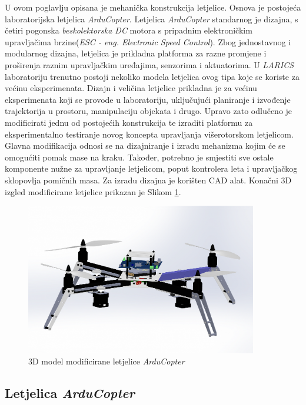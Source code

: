\documentclass[11pt,a4paper]{article}
\begin{document}
U ovom poglavlju opisana je mehanička konstrukcija letjelice. Osnova je postojeća laboratorijska letjelica  \textit{ArduCopter}. Letjelica  \textit{ArduCopter} standarnog je dizajna, s četiri pogonska \textit{beskolektorska DC} motora s pripadnim  elektroničkim upravljačima brzine(\textit{ESC - eng. Electronic Speed Control}). Zbog jednostavnog i modularnog dizajna, letjelica je prikladna platforma za razne promjene i proširenja raznim upravljačkim uređajima, senzorima i aktuatorima. U \textit{LARICS} laboratoriju trenutno postoji nekoliko modela letjelica ovog tipa koje se koriste za većinu eksperimenata. Dizajn i veličina letjelice prikladna je za većinu eksperimenata koji se provode u laboratoriju, uključujući planiranje i izvođenje trajektorija u prostoru, manipulaciju objekata i drugo. Upravo zato odlučeno je modificirati jednu od postojećih konstrukcija te izraditi platformu za eksperimentalno testiranje novog koncepta upravljanja višerotorskom letjelicom. Glavna modifikacija odnosi se na dizajniranje i izradu mehanizma kojim će se omogućiti pomak mase na kraku. Također, potrebno je smjestiti sve ostale komponente nužne za upravljanje letjelicom, poput kontrolera leta i upravljačkog sklopovlja pomičnih masa. Za izradu dizajna je korišten CAD alat. Konačni 3D izgled modificirane letjelice prikazan je Slikom \ref{Slika:3D_drone_final}.

\begin{figure}[H]
	\centering
	\includegraphics[width=0.9\textwidth]{figures/arducopter_with_PCB.png}
	\caption{3D model modificirane letjelice \textit{ArduCopter}}
	\label{Slika:3D_drone_final}
\end{figure}

\subsection{Letjelica  \textit{ArduCopter}}
\end{document}
